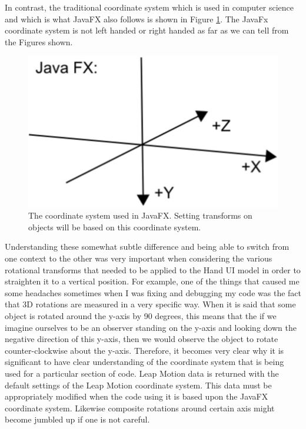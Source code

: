 In contrast, the traditional coordinate system which is used in computer science and which is what JavaFX also follows is shown in Figure \ref{fig:javafxcs}. The JavaFx coordinate system is not left handed or right handed as far as we can tell from the Figures shown. 
\begin{figure}[H]
\centering
\includegraphics[scale=0.35]{Figures/4_javafxCS.JPG}
\caption[JavaFX Coordinate System]{The coordinate system used in JavaFX. Setting transforms on objects will be based on this coordinate system.}
\label{fig:javafxcs}
\end{figure}

Understanding these somewhat subtle difference and being able to switch from one context to the other was very important when considering the various rotational transforms that needed to be applied to the Hand UI model in order to straighten it to a vertical position. For example, one of the things that caused me some headaches sometimes when I was fixing and debugging my code was the fact that 3D rotations are measured in a very specific way. When it is said that some object is rotated around the y-axis by 90 degrees, this means that the if we imagine ourselves to be an observer standing on the y-axis and looking down the negative direction of this y-axis, then we would observe the object to rotate counter-clockwise about the y-axis. Therefore, it becomes very clear why it is significant to have clear understanding of the coordinate system that is being used for a particular section of code. Leap Motion data is returned with the default settings of the Leap Motion coordinate system. This data must be appropriately modified when the code using it is based upon the JavaFX coordinate system. Likewise composite rotations around certain axis might become jumbled up if one is not careful.  	


